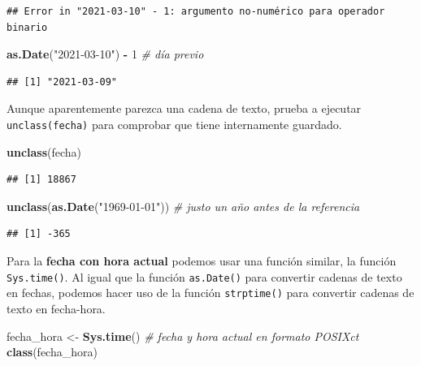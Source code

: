 \documentclass[11pt,]{book}
\newenvironment{Shaded}{\begin{snugshade}}{\end{snugshade}}
\newcommand{\CommentTok}[1]{\textcolor[rgb]{0.37,0.37,0.37}{\textit{#1}}}
\newcommand{\DecValTok}[1]{\textcolor[rgb]{0.06,0.06,0.06}{#1}}
\newcommand{\KeywordTok}[1]{\textcolor[rgb]{0.27,0.27,0.27}{\textbf{#1}}}
\newcommand{\NormalTok}[1]{#1}
\newcommand{\OperatorTok}[1]{\textcolor[rgb]{0.43,0.43,0.43}{\textbf{#1}}}
\newcommand{\StringTok}[1]{\textcolor[rgb]{0.5,0.5,0.5}{#1}}
\begin{document}
\begin{verbatim}
## Error in "2021-03-10" - 1: argumento no-numérico para operador binario
\end{verbatim}

\begin{Shaded}
\begin{Highlighting}[]
\KeywordTok{as.Date}\NormalTok{(}\StringTok{"2021-03-10"}\NormalTok{) }\OperatorTok{-}\StringTok{ }\DecValTok{1} \CommentTok{# día previo}
\end{Highlighting}
\end{Shaded}

\begin{verbatim}
## [1] "2021-03-09"
\end{verbatim}

Aunque aparentemente parezca una cadena de texto, prueba a ejecutar \texttt{unclass(fecha)} para comprobar que tiene internamente guardado.

\begin{Shaded}
\begin{Highlighting}[]
\KeywordTok{unclass}\NormalTok{(fecha)}
\end{Highlighting}
\end{Shaded}

\begin{verbatim}
## [1] 18867
\end{verbatim}

\begin{Shaded}
\begin{Highlighting}[]
\KeywordTok{unclass}\NormalTok{(}\KeywordTok{as.Date}\NormalTok{(}\StringTok{"1969-01-01"}\NormalTok{)) }\CommentTok{# justo un año antes de la referencia}
\end{Highlighting}
\end{Shaded}

\begin{verbatim}
## [1] -365
\end{verbatim}

Para la \textbf{fecha con hora actual} podemos usar una función similar, la función \texttt{Sys.time()}. Al igual que la función \texttt{as.Date()} para convertir cadenas de texto en fechas, podemos hacer uso de la función \texttt{strptime()} para convertir cadenas de texto en fecha-hora.

\begin{Shaded}
\begin{Highlighting}[]
\NormalTok{fecha_hora <-}\StringTok{ }\KeywordTok{Sys.time}\NormalTok{() }\CommentTok{# fecha y hora actual en formato POSIXct}
\KeywordTok{class}\NormalTok{(fecha_hora)}
\end{Highlighting}
\end{Shaded}
\end{document}
